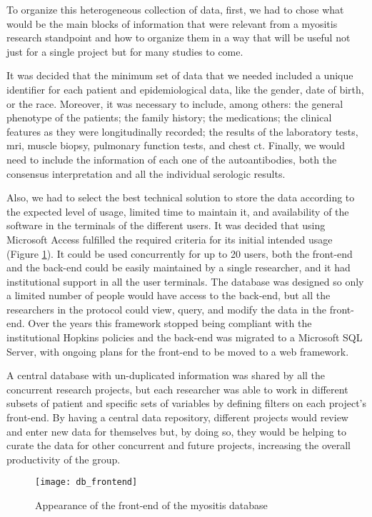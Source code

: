 To organize this heterogeneous collection of data, first, we had to chose what would be the main blocks of information that were relevant from a myositis research standpoint and how to organize them in a way that will be useful not just for a single project but for many studies to come.

It was decided that the minimum set of data that we needed included a unique identifier for each patient and epidemiological data, like the gender, date of birth, or the race. Moreover, it was necessary to include, among others: the general phenotype of the patients; the family history; the medications; the clinical features as they were longitudinally recorded; the results of the laboratory tests, \gls{mri}, muscle biopsy, pulmonary function tests, and chest \gls{ct}. Finally, we would need to include the information of each one of the autoantibodies, both the consensus interpretation and all the individual serologic results.

Also, we had to select the best technical solution to store the data according to the expected level of usage, limited time to maintain it, and availability of the software in the terminals of the different users. It was decided that using Microsoft Access fulfilled the required criteria for its initial intended usage (Figure \ref{fig:db_frontend}). It could be used concurrently for up to 20 users, both the front-end and the back-end could be easily maintained by a single researcher, and it had institutional support in all the user terminals. The database was designed so only a limited number of people would have access to the back-end, but all the researchers in the protocol could view, query, and modify the data in the front-end. Over the years this framework stopped being compliant with the institutional Hopkins policies and the back-end was migrated to a Microsoft SQL Server, with ongoing plans for the front-end to be moved to a web framework.

A central database with un-duplicated information was shared by all the concurrent research projects, but each researcher was able to work in different subsets of patient and specific sets of variables by defining filters on each project's front-end. By having a central data repository, different projects would review and enter new data for themselves but, by doing so, they would be helping to curate the data for other concurrent and future projects, increasing the overall productivity of the group.

\begin{figure}
	\centering
	\texttt{[image: db\_frontend]}
	\caption{Appearance of the front-end of the myositis database}
	\label{fig:db_frontend}
\end{figure}

